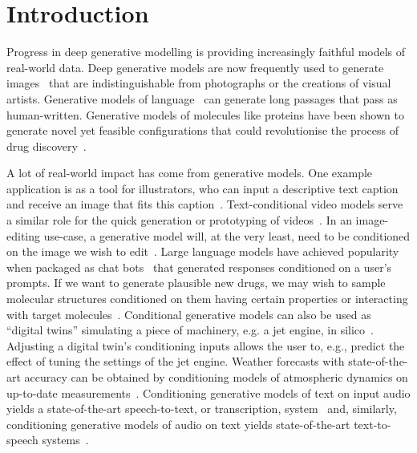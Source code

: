 \chapter{Introduction}
\label{ch:introduction}

Progress in deep generative modelling is providing increasingly faithful models of real-world data. Deep generative models are now frequently used to generate images~\citep{rombach2022high,ho2022imagen} that are indistinguishable from photographs or the creations of visual artists. Generative models of language~\citep{wolf2020transformers} can generate long passages that pass as human-written. Generative models of molecules like proteins have been shown to generate novel yet feasible configurations that could revolutionise the process of drug discovery~\citep{hoogeboom2022equivariant,watson2022broadly}. 

A lot of real-world impact has come from  generative models. 
One example application is as a tool for illustrators, who can input a descriptive text caption and receive an image that fits this caption~\citep{rombach2022high,ho2022imagen}. Text-conditional video models serve a similar role for the quick generation or prototyping of videos~\citep{ho2022video}. In an image-editing use-case, a generative model will, at the very least, need to be conditioned on the image we wish to edit~\citep{rombach2022high,sheynin2023emu}. Large language models have achieved popularity when packaged as chat bots~\citep{wolf2020transformers} that generated responses conditioned on a user's prompts. If we want to generate plausible new drugs, we may wish to sample molecular structures conditioned on them having certain properties or interacting with target molecules~\citep{watson2022broadly}. Conditional generative models can also be used as ``digital twins'' simulating a piece of machinery, e.g. a jet engine, in silico~\citep{munk2022probabilistic,fuller2020digital}. Adjusting a digital twin's conditioning inputs allows the user to, e.g., predict the effect of tuning the settings of the jet engine. Weather forecasts with state-of-the-art accuracy can be obtained by conditioning models of atmospheric dynamics on up-to-date measurements~\citep{lam2022graphcast}. Conditioning generative models of text on input audio yields a state-of-the-art speech-to-text, or transcription, system~\citep{radford2023robust} and, similarly, conditioning generative models of audio on text yields state-of-the-art text-to-speech systems~\citep{tan2024naturalspeech}.


